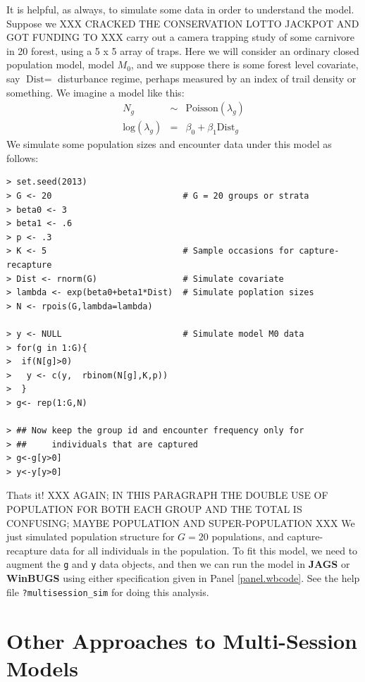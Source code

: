 It is helpful, as always, to simulate some data in order to understand
the model. Suppose we XXX CRACKED THE CONSERVATION LOTTO JACKPOT AND GOT FUNDING TO XXX carry out a camera trapping study of some
carnivore in 20 forest, using a 5 x 5 array of traps. Here we will
consider an ordinary closed population model, model $M_0$, and we
suppose there is 
some forest level covariate, say $\mbox{Dist} = $ disturbance regime, perhaps measured by an
index of trail density or something.
We imagine a model like this:
\begin{eqnarray*}
N_{g} &\sim& \mbox{Poisson}(\lambda_{g})  \\
\mbox{log}(\lambda_{g})& = &\beta_{0} + \beta_{1} \mbox{Dist}_{g} 
\end{eqnarray*}
We simulate some population sizes and encounter data under this model
as follows:
\begin{verbatim}
> set.seed(2013)
> G <- 20                          # G = 20 groups or strata
> beta0 <- 3
> beta1 <- .6
> p <- .3
> K <- 5                           # Sample occasions for capture-recapture
> Dist <- rnorm(G)                 # Simulate covariate
> lambda <- exp(beta0+beta1*Dist)  # Simulate poplation sizes 
> N <- rpois(G,lambda=lambda)

> y <- NULL                        # Simulate model M0 data
> for(g in 1:G){
>  if(N[g]>0)
>   y <- c(y,  rbinom(N[g],K,p))
>  }
> g<- rep(1:G,N)

> ## Now keep the group id and encounter frequency only for
> ##     individuals that are captured 
> g<-g[y>0]
> y<-y[y>0]
\end{verbatim}
Thats it! XXX AGAIN; IN THIS PARAGRAPH THE DOUBLE USE OF POPULATION FOR BOTH EACH GROUP AND THE TOTAL IS CONFUSING; MAYBE POPULATION AND SUPER-POPULATION XXX
We just simulated population structure for $G=20$ populations, and
capture-recapture data for all individuals in the population. To fit
this model, we need to augment the \mbox{\tt g} and \mbox{\tt y} data
objects, and then we can run the model in {\bf JAGS} or {\bf WinBUGS}
using either specification given in Panel \ref{panel.wbcode}.
See the help file \mbox{\tt ?multisession\_sim}
for doing this analysis. 



\section{Other Approaches to Multi-Session Models}


